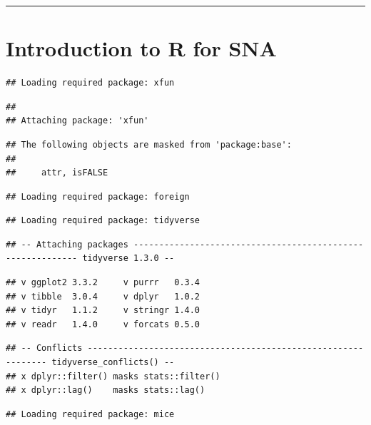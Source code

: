 \documentclass[
]{book}
\begin{document}
\begin{center}\rule{0.5\linewidth}{0.5pt}\end{center}

\hypertarget{appendix-appendix}{%
\appendix}


\hypertarget{tutorial}{%
\chapter{Introduction to R for SNA}\label{tutorial}}

\begin{verbatim}
## Loading required package: xfun
\end{verbatim}

\begin{verbatim}
## 
## Attaching package: 'xfun'
\end{verbatim}

\begin{verbatim}
## The following objects are masked from 'package:base':
## 
##     attr, isFALSE
\end{verbatim}

\begin{verbatim}
## Loading required package: foreign
\end{verbatim}

\begin{verbatim}
## Loading required package: tidyverse
\end{verbatim}

\begin{verbatim}
## -- Attaching packages ----------------------------------------------------------- tidyverse 1.3.0 --
\end{verbatim}

\begin{verbatim}
## v ggplot2 3.3.2     v purrr   0.3.4
## v tibble  3.0.4     v dplyr   1.0.2
## v tidyr   1.1.2     v stringr 1.4.0
## v readr   1.4.0     v forcats 0.5.0
\end{verbatim}

\begin{verbatim}
## -- Conflicts -------------------------------------------------------------- tidyverse_conflicts() --
## x dplyr::filter() masks stats::filter()
## x dplyr::lag()    masks stats::lag()
\end{verbatim}

\begin{verbatim}
## Loading required package: mice
\end{verbatim}
\end{document}
